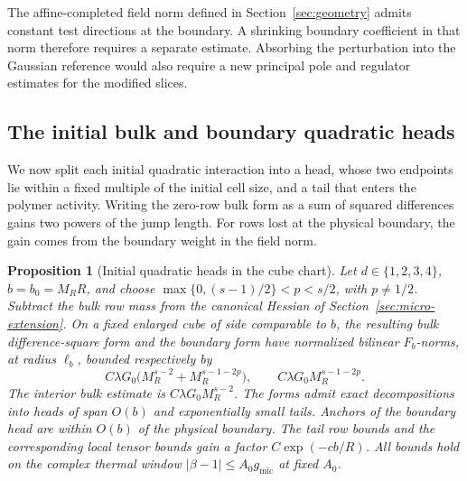 \documentclass[11pt]{article}
\newtheorem{proposition}[theorem]{Proposition}
\theoremstyle{definition}
\begin{document}
The affine-completed field norm defined in Section~\ref{sec:geometry} admits constant
test directions at the boundary. A shrinking boundary coefficient in
that norm therefore requires a separate estimate. Absorbing the
perturbation into the Gaussian reference would also require a new
principal pole and regulator estimates for the modified slices.

\subsection{The initial bulk and boundary quadratic heads}
\label{sec:initial-heads}

We now split each initial quadratic interaction into a head, whose
two endpoints lie within a fixed multiple of the initial cell size,
and a tail that enters the polymer activity. Writing the zero-row
bulk form as a sum of squared differences gains two powers of the
jump length. For rows lost at the physical boundary, the gain comes
from the boundary weight in the field norm.

\begin{proposition}[Initial quadratic heads in the cube chart]
\label{prop:initial-cube-heads}
Let \(d\in\{1,2,3,4\}\), \(b=b_0=M_R R\), and choose
\(\max\{0,(s-1)/2\}<p<s/2\), with \(p\ne 1/2\). Subtract the bulk row
mass from the canonical Hessian of Section~\ref{sec:micro-extension}.
On a fixed enlarged cube of side comparable to \(b\), the resulting
bulk difference-square form and the boundary form have normalized
bilinear \(F_b\)-norms, at radius \(\ell_b\), bounded respectively by
\begin{equation}
 C\lambda G_0\big(M_R^{s-2}+M_R^{s-1-2p}\big),
 \qquad C\lambda G_0 M_R^{s-1-2p}.
\end{equation}
The interior bulk estimate is \(C\lambda G_0 M_R^{s-2}\).
The forms admit exact decompositions into heads of span \(O(b)\)
and exponentially small tails. Anchors of the boundary head are
within \(O(b)\) of the physical boundary. The tail row bounds and
the corresponding local tensor bounds gain a factor
\(C\exp(-c b/R)\). All bounds hold on the complex thermal window
\(|\beta-1|\le A_0g_{\mathrm{mic}}\) at fixed \(A_0\).
\end{proposition}
\end{document}
